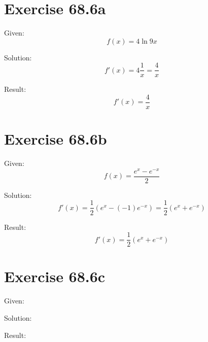 \documentclass[a4paper, 10pt]{scrartcl}
\begin{document}
\section{Exercise 68.6a}

Given:
\[f(x) = 4\ln{9x}\]

Solution:
\[f'(x) = 4\frac{1}{x} = \frac{4}{x}\]

Result:
\[f'(x) = \frac{4}{x}\]

\section{Exercise 68.6b}

Given:
\[f(x) = \frac{e^{x} - e^{-x}}{2}\]

Solution:
\[f'(x) = \frac{1}{2}(e^{x} - (-1)e^{-x}) = \frac{1}{2}(e^{x} + e^{-x})\]

Result:
\[f'(x) = \frac{1}{2}(e^{x} + e^{-x})\]

\section{Exercise 68.6c}

Given:

Solution:

Result:
\end{document}
